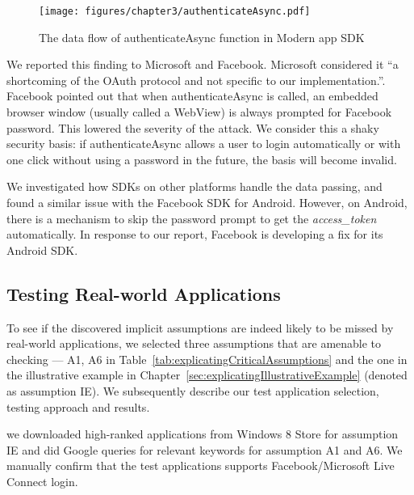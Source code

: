 \begin{figure}[hbt]
\centering
\texttt{[image: figures/chapter3/authenticateAsync.pdf]}
\caption{The data flow of authenticateAsync function in Modern app SDK}
\label{fig:authenticateAsync}
\end{figure}
 
We reported this finding to Microsoft and Facebook.  Microsoft considered it ``a shortcoming of the OAuth protocol and not specific to our implementation.''.  Facebook pointed out that when authenticateAsync is called, an embedded browser window (usually called a WebView) is always prompted for Facebook password.  This lowered the severity of the attack.  We consider this a shaky security basis: if authenticateAsync allows a user to login automatically or with one click without using a password in the future, the basis will become invalid. 

We investigated how SDKs on other platforms handle the data passing, and found a similar issue with the Facebook SDK for Android.  However, on Android, there is a mechanism to skip the password prompt to get the \emph{access\_token} automatically. In response to our report, Facebook is developing a fix for its Android SDK.

\subsection{Testing Real-world Applications}
\label{sec:explicatingTest}

To see if the discovered implicit assumptions are indeed likely to be missed by real-world applications, we selected three assumptions that are amenable to checking --- A1, A6 in Table~\ref{tab:explicatingCriticalAssumptions} and the one in the illustrative example in Chapter~\ref{sec:explicatingIllustrativeExample} (denoted as assumption IE).  We subsequently describe our test application selection, testing approach and results.

 we downloaded high-ranked applications from Windows 8 Store for assumption IE and did Google queries for relevant keywords for assumption A1 and A6.  We manually confirm that the test applications supports Facebook/Microsoft Live Connect login.


